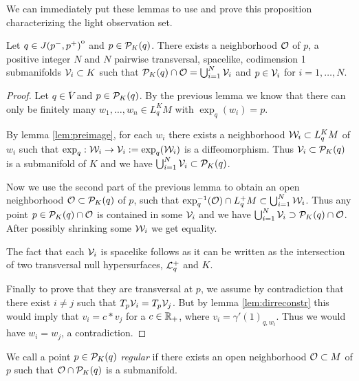 We can immediately put these lemmas to use and prove this proposition characterizing the light observation set.
\begin{proposition}\label{prop:unionmanif}
Let $q\in {\kern0ptJ(p^-,p^+)}^{\mathrm{o}}$ and $p\in \mathcal{P}_K(q)$. There exists a neighborhood $\mathcal{O}$ of $p$, a positive integer $N$ and $N$ pairwise transversal, spacelike,  codimension 1 submanifolds $\mathcal{V}_i\subset K$ such that $\mathcal{P}_K(q) \cap \mathcal{O} = \bigcup_{i=1}^N \mathcal{V}_i$ and $p\in \mathcal{V}_i$ for $i={1,\dots, N}$.
\end{proposition}
\begin{proof}
    Let $q\in \overline{V}$ and $p\in \mathcal{P}_K(q)$. By the previous lemma we know that there can only be finitely many $w_1,\dots,w_n\in L^K_qM$ with $\exp_q(w_i)=p$. 

    By lemma \ref{lem:preimage}, for each $w_i$ there exists a neighborhood $\mathcal{W}_i\subset L^K_qM$ of $w_i$ such that $\exp_q:\mathcal{W}_i\to \mathcal{V}_i:=\exp_q(\mathcal{W}_i)$ is a diffeomorphism. Thus $\mathcal{V}_i\subset \mathcal{P}_K(q)$ is a submanifold of $K$ and we have $\bigcup_{i=1}^N\mathcal{V}_i\subset \mathcal{P}_K(q)$. 

    Now we use the second part of the previous lemma to obtain an open neighborhood $\mathcal{O}\subset \mathcal{P}_K(q)$ of $p$, such that $\exp_q^{-1}(\mathcal{O})\cap L^+_qM\subset \bigcup_{i=1}^N \mathcal{W}_i$. Thus any point $p\in \mathcal{P}_K(q) \cap \mathcal{O}$ is contained in some $\mathcal{V}_i$ and we have $\bigcup_{i=1}^N\mathcal{V}_i \supset \mathcal{P}_K(q)\cap \mathcal{O}$. After possibly shrinking some $\mathcal{W}_i$ we get equality.

    The fact that each $\mathcal{V}_i$ is spacelike follows as it can be written as the intersection of two transversal null hypersurfaces, $\mathcal{L}^+_q$ and $K$.

    Finally to prove that they are transversal at $p$, we assume by contradiction that there exist $i\neq j$ such that $T_p\mathcal{V}_i=T_p\mathcal{V}_j$. But by lemma \ref{lem:dirreconstr} this would imply that $v_i = c*v_j$ for a $c\in \mathbb{R}_+$, where $v_i = \gamma'(1)_{q,w_i}$. Thus we would have $w_i = w_j$, a contradiction.
\end{proof}

\begin{definition}
We call a point $p\in \mathcal{P}_K(q)$ \emph{regular} if there exists an open neighborhood $\mathcal{O}\subset M$ of $p$ such that $\mathcal{O}\cap \mathcal{P}_K(q)$ is a submanifold.
\end{definition}


